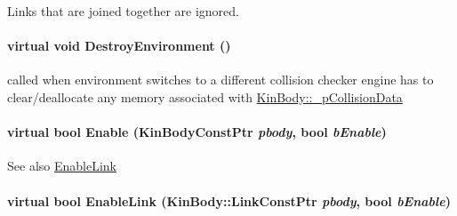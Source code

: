 Links that are joined together are ignored. \hypertarget{classOpenRAVE_1_1CollisionCheckerBase_addd261b357621ad88f262f311792efb6}{
\paragraph[{DestroyEnvironment}]{\setlength{\rightskip}{0pt plus 5cm}virtual void DestroyEnvironment ()}\hfill}
\label{classOpenRAVE_1_1CollisionCheckerBase_addd261b357621ad88f262f311792efb6}
called when environment switches to a different collision checker engine has to clear/deallocate any memory associated with \hyperlink{classOpenRAVE_1_1KinBody_a0a17ef574c66277ef313e5e56d6b9bbc}{KinBody::\_\-pCollisionData} \hypertarget{classOpenRAVE_1_1CollisionCheckerBase_a1217341e547ceb062850dc9d05f4f409}{
\paragraph[{Enable}]{\setlength{\rightskip}{0pt plus 5cm}virtual bool Enable (KinBodyConstPtr {\em pbody}, \/  bool {\em bEnable})}\hfill}
\label{classOpenRAVE_1_1CollisionCheckerBase_a1217341e547ceb062850dc9d05f4f409}
\begin{DoxySeeAlso}{See also}
\hyperlink{classOpenRAVE_1_1CollisionCheckerBase_aad5eb39360dbde52e90efd9f2a466ab4}{EnableLink} 
\end{DoxySeeAlso}
\hypertarget{classOpenRAVE_1_1CollisionCheckerBase_aad5eb39360dbde52e90efd9f2a466ab4}{
\paragraph[{EnableLink}]{\setlength{\rightskip}{0pt plus 5cm}virtual bool EnableLink (KinBody::LinkConstPtr {\em pbody}, \/  bool {\em bEnable})}\hfill}
